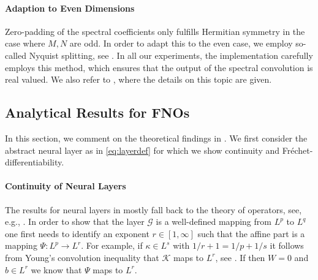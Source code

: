 \paragraph{Adaption to Even Dimensions}
%
%
Zero-padding of the spectral coefficients only fulfills Hermitian symmetry in the case where $M,N$ are odd. In order to adapt this to the even case, we employ so-called Nyquist splitting, see \cite{trigo19}. In all our experiments, the implementation carefully employs this method, which ensures that the output of the spectral convolution is real valued. We also refer to \cite[Sec. 3.3]{kabri2023resolution}, where the details on this topic are given.
%
%
\subsection{Analytical Results for FNOs}\label{sec:FNOAna}
%
%
In this section, we comment on the theoretical findings in \cite{kabri2023resolution}. We first consider the abstract neural layer as in \cref{eq:layerdef} for which we show continuity and Fréchet-differentiability.
%
%
\paragraph{Continuity of Neural Layers} The results for neural layers in \cite{kabri2023resolution} mostly fall back to the theory of \Nem{} operators, see, e.g., \cite{tröltzsch, ambrosetti}. In order to show that the layer $\mathcal{G}$ is a well-defined mapping from $L^p$ to $L^q$ one first needs to identify an exponent $r\in [1,\infty]$ such that the affine part is a mapping $\Psi:L^p\to L^r$. For example, if $\kappa\in L^s$ with $1/r + 1 = 1/p + 1/s$ it follows from Young's convolution inequality that $\mathcal{K}$ maps to $L^r$, see \cite[Thm. 1.2.12]{grafakos}. If then $W=0$ and $b\in L^r$ we know that $\Psi$ maps to $L^r$.

